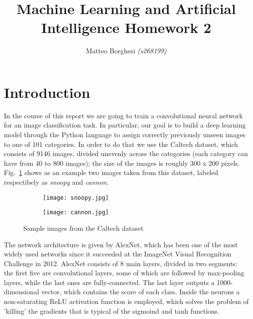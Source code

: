 \documentclass[11pt,twoside,a4paper]{article}
\begin{document}
\title{Machine Learning and Artificial Intelligence Homework 2}
\author{Matteo Borghesi \textit{(s268199)}}
\maketitle

\section{Introduction}
In the course of this report we are going to train a convolutional neural network for an image classification task. In particular, our goal is to build a deep learning model through the Python language to assign correctly previously unseen images to one of 101 categories.\newline
In order to do that we use the Caltech dataset, which consists of 9146 images, divided unevenly across the categories (each category can have from 40 to 800 images); the size of the images is roughly 300 x 200 pixels. Fig.~\ref{fig:caltech} shows as an example two images taken from this dataset, labeled respectibely as \textit{snoopy} and \textit{cannon}.

\begin{figure}[!b]
    \centering
    \begin{subfigure}{0.35\textwidth}
	\texttt{[image: snoopy.jpg]}
        \caption{}
    \end{subfigure}
    \begin{subfigure}{0.35\textwidth}
	\texttt{[image: cannon.jpg]}
        \caption{}
    \end{subfigure}
    \caption{Sample images from the Caltech dataset}
    \label{fig:caltech}
\end{figure}

The network architecture is given by AlexNet, which has been one of the most widely used networks since it succeeded at the ImageNet Visual Recognition Challenge in 2012. AlexNet consists of 8 main layers, divided in two segments: the first five are convolutional layers, some of which are followed by max-pooling layers, while the last ones are fully-connected. The last layer outputs a 1000-dimensional vector, which contains the score of each class. Inside the neurons a non-saturating ReLU activation function is employed, which solves the problem of 'killing' the gradients that is typical of the sigmoind and tanh functions.
\end{document}
